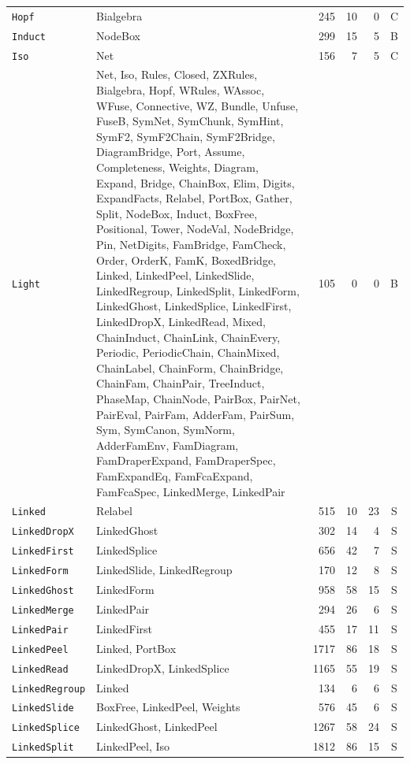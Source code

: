 {\begin{xltabular}{\textwidth}{@{}l>{\raggedright\arraybackslash}Xrrrc@{}}
\texttt{Hopf} & Bialgebra & 245 & 10 & 0 & C \\
\texttt{Induct} & NodeBox & 299 & 15 & 5 & B \\
\texttt{Iso} & Net & 156 & 7 & 5 & C \\
\texttt{Light} & Net, Iso, Rules, Closed, ZXRules, Bialgebra, Hopf, WRules, WAssoc, WFuse, Connective, WZ, Bundle, Unfuse, FuseB, SymNet, SymChunk, SymHint, SymF2, SymF2Chain, SymF2Bridge, DiagramBridge, Port, Assume, Completeness, Weights, Diagram, Expand, Bridge, ChainBox, Elim, Digits, ExpandFacts, Relabel, PortBox, Gather, Split, NodeBox, Induct, BoxFree, Positional, Tower, NodeVal, NodeBridge, Pin, NetDigits, FamBridge, FamCheck, Order, OrderK, FamK, BoxedBridge, Linked, LinkedPeel, LinkedSlide, LinkedRegroup, LinkedSplit, LinkedForm, LinkedGhost, LinkedSplice, LinkedFirst, LinkedDropX, LinkedRead, Mixed, ChainInduct, ChainLink, ChainEvery, Periodic, PeriodicChain, ChainMixed, ChainLabel, ChainForm, ChainBridge, ChainFam, ChainPair, TreeInduct, PhaseMap, ChainNode, PairBox, PairNet, PairEval, PairFam, AdderFam, PairSum, Sym, SymCanon, SymNorm, AdderFamEnv, FamDiagram, FamDraperExpand, FamDraperSpec, FamExpandEq, FamFcaExpand, FamFcaSpec, LinkedMerge, LinkedPair & 105 & 0 & 0 & B \\
\texttt{Linked} & Relabel & 515 & 10 & 23 & S \\
\texttt{LinkedDropX} & LinkedGhost & 302 & 14 & 4 & S \\
\texttt{LinkedFirst} & LinkedSplice & 656 & 42 & 7 & S \\
\texttt{LinkedForm} & LinkedSlide, LinkedRegroup & 170 & 12 & 8 & S \\
\texttt{LinkedGhost} & LinkedForm & 958 & 58 & 15 & S \\
\texttt{LinkedMerge} & LinkedPair & 294 & 26 & 6 & S \\
\texttt{LinkedPair} & LinkedFirst & 455 & 17 & 11 & S \\
\texttt{LinkedPeel} & Linked, PortBox & 1717 & 86 & 18 & S \\
\texttt{LinkedRead} & LinkedDropX, LinkedSplice & 1165 & 55 & 19 & S \\
\texttt{LinkedRegroup} & Linked & 134 & 6 & 6 & S \\
\texttt{LinkedSlide} & BoxFree, LinkedPeel, Weights & 576 & 45 & 6 & S \\
\texttt{LinkedSplice} & LinkedGhost, LinkedPeel & 1267 & 58 & 24 & S \\
\texttt{LinkedSplit} & LinkedPeel, Iso & 1812 & 86 & 15 & S \\

\end{xltabular}}
